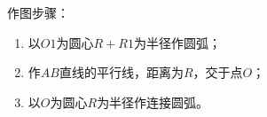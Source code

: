 \begin{enumerate}
\begin{enumerate}
作图步骤：
\begin{enumerate}
\item 以$O1$为圆心$R+R1$为半径作圆弧；
\item 作$AB$直线的平行线，距离为$R$，交于点$O$；
\item 以$O$为圆心$R$为半径作连接圆弧。
\end{enumerate}
\end{enumerate}
\end{enumerate}

\endinput
